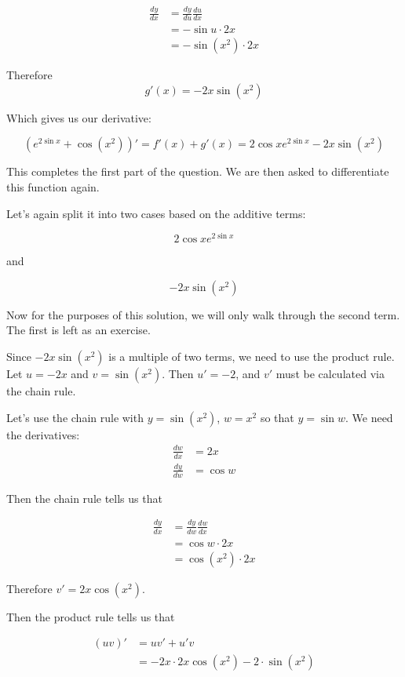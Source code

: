 \begin{solution}
    \begin{align*}
        \frac{dy}{dx} &= \frac{dy}{du}\frac{du}{dx} \\ 
         &= -\sin u \cdot 2x \tag{substituting}\\
         &= -\sin(x^2) \cdot 2x \tag{using $u = x^2$}
    \end{align*}

    Therefore 
    \[ g'(x) = -2x \sin(x^2)\]

    Which gives us our derivative:

    \[(e^{2\sin x} + \cos (x^2))' = f'(x) + g'(x) = 2\cos x  e^{2\sin x} -2x \sin(x^2)\]

    This completes the first part of the question. We are then asked to differentiate this function again.

    Let's again split it into two cases based on the additive terms:

    \[2\cos x  e^{2\sin x}\]

    and 

    \[-2x \sin(x^2)\]

    Now for the purposes of this solution, we will only walk through the second term. The first is left as an exercise.

    Since $-2x \sin(x^2)$ is a multiple of two terms, we need to use the product rule.
    Let $u= -2x$ and $v = \sin (x^2)$. Then $u' = -2$, and $v'$ must be calculated via the chain rule.

    Let's use the chain rule with $y = \sin(x^2)$, $w = x^2$ so that $y = \sin w$. We need the derivatives:
    \begin{align*}
        \frac{dw}{dx} &= 2x \\ 
        \frac{dy}{dw} &= \cos w
    \end{align*}
    
    Then the chain rule tells us that

    \begin{align*}
        \frac{dy}{dx} &= \frac{dy}{dw} \frac{dw}{dx} \\
         &= \cos w \cdot 2x \tag{substituting}\\
         &= \cos (x^2) \cdot 2x
    \end{align*}

    Therefore $v' = 2x\cos (x^2) $.

    Then the product rule tells us that

    \begin{align*}
        (uv)' &= uv' + u'v \\
         &= -2x \cdot 2x\cos (x^2) -2 \cdot \sin (x^2)
    \end{align*}


\end{solution}
